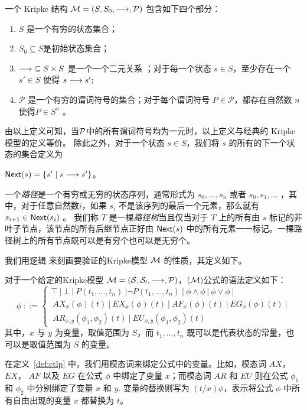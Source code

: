 \begin{definition}[Kripke 模型]
	一个 Kripke 结构 ${\cal M} = (S, S_0,\longrightarrow, \mathcal{P})$ 包含如下四个部分：
	\begin{enumerate}
		\item $S$ 是一个有穷的状态集合；
		\item $S_0\subseteq S$是初始状态集合；
		\item $\longrightarrow\;\subseteq S \times S$ 是一个一个二元关系 ；对于每一个状态 $s\in S$，至少存在一个 $s'\in S$ 使得 $s\longrightarrow s'$;
		\item $\mathcal{P}$ 是一个有穷的谓词符号的集合；对于每个谓词符号 $P\in \mathcal{P}$，都存在自然数 $n$ 使得$P\in S^n$ 。
	\end{enumerate}
\end{definition}
由以上定义可知，当$\cal P$中的所有谓词符号均为一元时，以上定义与经典的 Kripke 模型的定义等价。
除此之外，对于一个状态 $s\in S$，我们将 $s$ 的所有的下一个状态的集合定义为
\begin{center}
	$\textsf{Next}({s}) = \{s'\mid s\longrightarrow s'\}$。 
\end{center} 
一个\textit{路径}是一个有穷或无穷的状态序列，通常形式为 $s_0,...,s_n$ 或者 $s_0,s_1,...$ ，其中，对于任意自然数$i$，如果 $s_i$ 不是该序列的最后一个元素，那么就有 $s_{i+1}\in \textsf{Next}({s_i})$ 。
我们称 $T$ 是一棵\textit{路径树}当且仅当对于 $T$ 上的所有由 $s$ 标记的非叶子节点，该节点的所有后继节点正好由 $\textsf{Next}({s})$ 中的所有元素一一标记。一棵路径树上的所有节点既可以是有穷个也可以是无穷个。

我们用逻辑  来刻画要验证的Kripke模型 $\cal M$ 的性质，其定义如下。

\begin{definition}[\CTLP{}]
	\label{def:ctlp}
    对于一个给定的Kripke模型 $\cal M = (S, S_0,\longrightarrow, \mathcal{P})$，\CTLP{}$(\cal M)$公式的语法定义如下：
        $$\phi \ ::=
        \left\{\begin{array}{l}
        \top\ | \ \bot \ | \ P(t_1, ..., t_n)\  | \neg P(t_1, ..., t_n)\  | \ \phi  \wedge \phi \ |\ \phi \vee \phi \ | \\
        \ AX_x(\phi)(t)\ | \ EX_x(\phi)(t) \ | \ AF_x(\phi)(t) \ | \ EG_x(\phi)(t) \ |\\
        \ AR_{x,y}(\phi_1,\phi_2)(t)\ | \ EU_{x,y}(\phi_1,\phi_2)(t)
        \end{array}
        \right.$$
    其中，$x$ 与 $y$ 为变量，取值范围为 $S$，而 $t_1,...,t_n$ 既可以是代表状态的常量，也可以是取值范围为 $S$ 的变量。
\end{definition}
在定义~\ref{def:ctlp} 中，我们用模态词来绑定公式中的变量。比如，模态词 $AX$，$EX$， $AF$ 以及 $EG$ 在公式 $\phi$ 中绑定了变量 $x$；而模态词 $AR$ 和 $EU$ 则在公式 $\phi_1$ 和 $\phi_2$ 中分别绑定了变量 $x$ 和 $y$. 变量的替换则写为 $(t/x)\phi$，表示将公式 $\phi$ 中所有自由出现的变量 $x$ 都替换为 $t$。

